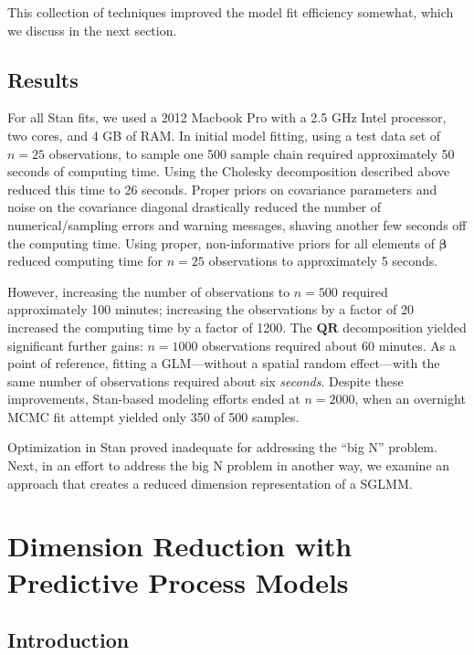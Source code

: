 This collection of techniques improved the model fit efficiency somewhat, which we discuss in the next section.

\subsection{Results}

For all Stan fits, we used a 2012 Macbook Pro with a 2.5 GHz Intel processor, two cores, and 4 GB of RAM. In initial model fitting, using a test data set of $n = 25$ observations, to sample one 500 sample chain required approximately 50 seconds of computing time. Using the Cholesky decomposition described above reduced this time to 26 seconds. Proper priors on covariance parameters and noise on the covariance diagonal drastically reduced the number of numerical/sampling errors and warning messages, shaving another few seconds off the computing time. Using proper, non-informative priors for all elements of $\pmb{\beta}$ reduced computing time for $n=25$ observations to approximately 5 seconds. 

However, increasing the number of observations to $n=500$ required approximately 100 minutes; increasing the observations by a factor of 20 increased the computing time by a factor of 1200. The $\pmb{QR}$ decomposition yielded significant further gains: $n = 1000$ observations required about 60 minutes. As a point of reference, fitting a GLM---without a spatial random effect---with the same number of observations required about six {\it seconds}. Despite these improvements, Stan-based modeling efforts ended at $n = 2000$, when an overnight MCMC fit attempt yielded only 350 of 500 samples.

Optimization in Stan proved inadequate for addressing the ``big N'' problem. Next, in an effort to address the big N problem in another way, we examine an approach that creates a reduced dimension representation of a SGLMM. 

\section{Dimension Reduction with Predictive Process Models} \label{ppm} 

\subsection{Introduction} %

